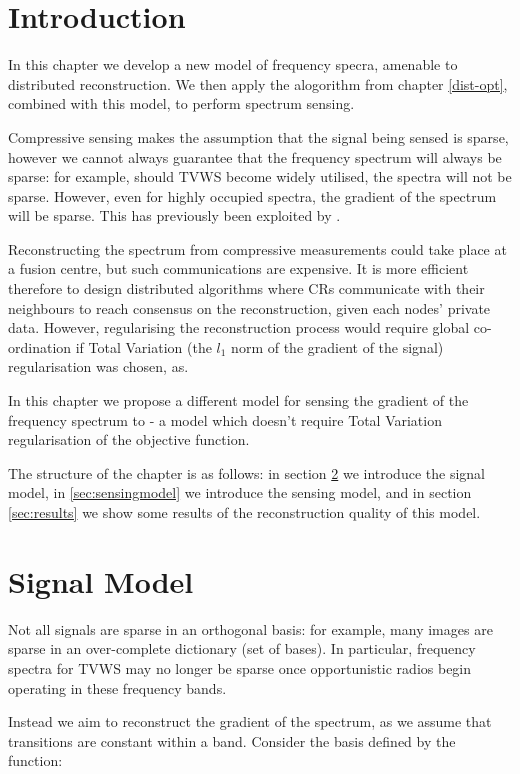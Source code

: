 \section{Introduction}

In this chapter we develop a new model of frequency specra, amenable to distributed reconstruction. We then apply the alogorithm from chapter \ref{dist-opt}, combined with this model, to perform spectrum sensing.

Compressive sensing makes the assumption that the signal being sensed is sparse, however we cannot always guarantee that the frequency spectrum will always be sparse: for example, should TVWS become widely utilised, the spectra will not be sparse. However, even for highly occupied spectra, the gradient of the spectrum will be sparse. This has previously been exploited by \cite{tian2006wavelet}. 

Reconstructing the spectrum from compressive measurements could take place at a fusion centre, but such communications are expensive. It is more efficient therefore to design distributed algorithms where CRs communicate with their neighbours to reach consensus on the reconstruction, given each nodes' private data. However, regularising the reconstruction process would require global co-ordination if Total Variation (the \(l_1\) norm of the gradient of the signal) regularisation was chosen, as.

In this chapter we propose a different model for sensing the gradient of the frequency spectrum to \cite{tian2006wavelet} - a model which doesn't require Total Variation regularisation of the objective function. 

The structure of the chapter is as follows: in section \ref{sec:sig-model} we introduce the signal model, in \ref{sec:sensingmodel} we introduce the sensing model, and in section \ref{sec:results} we show some results of the reconstruction quality of this model. 

\section{Signal Model}\label{sec:sig-model}

Not all signals are sparse in an orthogonal basis: for example, many images are sparse in an over-complete dictionary (set of bases). In particular, frequency spectra for TVWS may no longer be sparse once opportunistic radios begin operating in these frequency bands. 

Instead we aim to reconstruct the gradient of the spectrum, as we assume that transitions are constant within a band. Consider the basis defined by the function:

